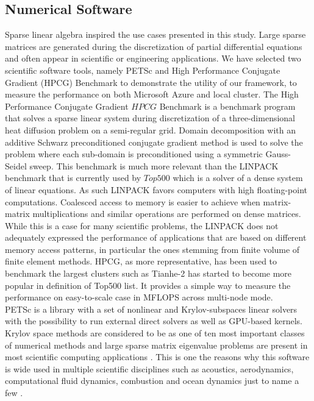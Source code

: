 \documentclass[3p,times]{elsarticle}
\begin{document}
\subsection{Numerical Software}
\label{sec:numerical}

Sparse linear algebra inspired the use cases presented in this study. Large sparse matrices are generated during the discretization of partial differential equations and often appear in scientific or engineering applications. We have selected two scientific software tools, namely PETSc and High Performance Conjugate Gradient (HPCG) Benchmark to demonstrate the utility of our framework, to measure the performance on both Microsoft Azure and local cluster. 
The High Performance Conjugate Gradient \(HPCG\) Benchmark \cite{Heroux2013} is a benchmark program that solves a sparse linear system during discretization of a three-dimensional heat diffusion problem on a semi-regular grid. Domain decomposition with an additive Schwarz preconditioned conjugate gradient method is used to solve the problem where each sub-domain is preconditioned using a symmetric Gauss-Seidel sweep. This benchmark is much more relevant than the LINPACK benchmark that is currently used by $Top500$ which is a solver of a dense system of linear equations. As such LINPACK favors computers with high floating-point computations. Coalesced access to memory is easier to achieve when matrix-matrix multiplications and similar operations are performed on dense matrices. While this is a case for many scientific problems, the LINPACK does not adequately expressed the performance of applications that are based on different memory access patterns, in particular the ones stemming from finite volume of finite element methods. HPCG, as more representative, has been used to benchmark the largest clusters such as Tianhe-2 \cite{Xianyi2014} has started to become more popular in definition of Top500 list. It provides a simple way to measure the performance on easy-to-scale case in MFLOPS across multi-node mode. \\
PETSc is a library with a set of nonlinear and Krylov-subspaces linear solvers with the possibility to run external direct solvers as well as GPU-based kernels. Krylov space methods are considered to be as one of ten most important classes of numerical methods and large sparse matrix eigenvalue problems are present in most scientific computing applications \cite{Gutknecht2005}. This is one the reasons why this software is wide used in multiple scientific disciplines such as acoustics, aerodynamics, computational fluid dynamics, combustion and ocean dynamics just to name a few \cite{petsc-efficient}.\\
\end{document}
